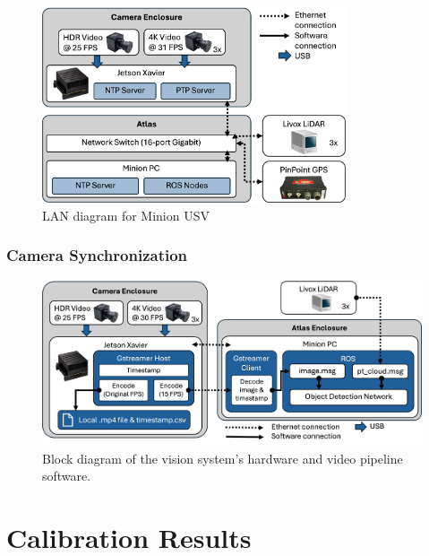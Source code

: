 \documentclass{erauthesis}
\begin{document}
\begin{figure}[htbp]
\centering
\includegraphics[width=0.8\textwidth]{Images/network_diagram2.png}
\caption{LAN diagram for Minion USV}
\label{fig:network_sync}
\end{figure}

\subsubsection{Camera Synchronization} \label{time_sync_cam}

\begin{figure}[htbp]
\centering
\includegraphics[width=5in]{Images/Video_Block_Diagram.png}
\caption{Block diagram of the vision system's hardware and video pipeline software.}
\label{video_pipeline}
\end{figure}



\section{Calibration Results} \label{sec:calib_results}
\end{document}
